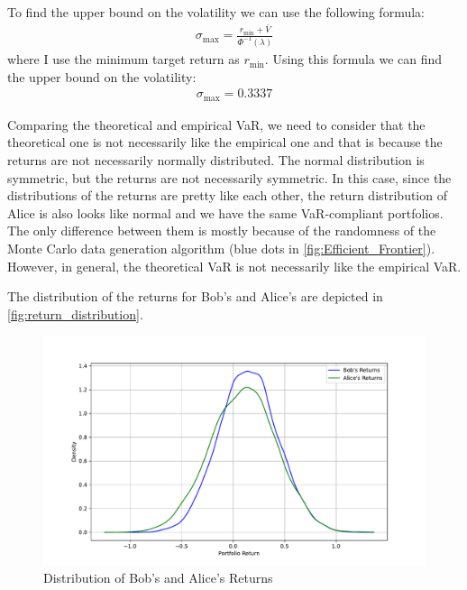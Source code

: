 \documentclass[a4paper,10pt,american]{article}
\begin{document}
To find the upper bound on the volatility we can use the following formula:
\begin{align}
    \sigma_{\text{max}} = \frac{r_{\text{min}}+\bar{V}}{\Phi^{-1}(\lambda)}
\end{align}
where I use the minimum target return as $r_{\text{min}}$. Using this formula we can find the upper bound on the volatility:
\begin{align}
    \sigma_{\text{max}} = 0.3337
\end{align}

Comparing the theoretical and empirical VaR, we need to consider that the theoretical one is not necessarily like the empirical one and that is because the returns are not necessarily normally distributed. The normal distribution is symmetric, but the returns are not necessarily symmetric. In this case, since the distributions of the returns are pretty like each other, the return distribution of Alice is also looks like normal and we have the same VaR-compliant portfolios. The only difference between them is mostly because of the randomness of the Monte Carlo data generation algorithm (blue dots in \autoref{fig:Efficient_Frontier}). However, in general, the theoretical VaR is not necessarily like the empirical VaR. 

The distribution of the returns for Bob's and Alice's are depicted in \autoref{fig:return_distribution}.

\begin{figure}[H]
    \centering
    \includegraphics[width=1\linewidth]{../Plots/return_distribution.pdf}
    \caption{Distribution of Bob's and Alice's Returns}
    \label{fig:return_distribution}
\end{figure}






















% 
\end{document}
